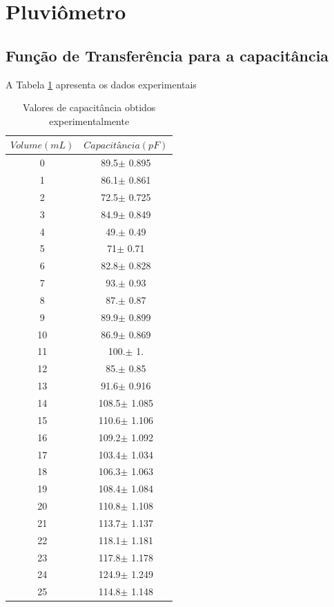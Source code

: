 \documentclass[a4paper]{instrumentacao}
\begin{document}

\section{Pluviômetro}
\subsection{Função de Transferência para a capacitância}

A Tabela \ref{tab:resultados-pluviometro-capacitancia} apresenta os dados experimentais 

\begin{longtable}{cc}
\caption{Valores de capacitância obtidos experimentalmente} \label{tab:resultados-pluviometro-capacitancia} \\
\textbf{$Volume (mL)$} & \textbf{$Capacitância (pF)$} \\ \hline
 0 & 89.5$\pm$ 0.895 \\
 1 & 86.1$\pm$ 0.861 \\
 2 & 72.5$\pm$ 0.725 \\
 3 & 84.9$\pm$ 0.849 \\
 4 & 49.$\pm$ 0.49 \\
 5 & 71$\pm$ 0.71 \\
 6 & 82.8$\pm$ 0.828 \\
 7 & 93.$\pm$ 0.93 \\
 8 & 87.$\pm$ 0.87 \\
 9 & 89.9$\pm$ 0.899 \\
 10 & 86.9$\pm$ 0.869 \\
 11 & 100.$\pm$ 1. \\
 12 & 85.$\pm$ 0.85 \\
 13 & 91.6$\pm$ 0.916 \\
 14 & 108.5$\pm$ 1.085 \\
 15 & 110.6$\pm$ 1.106 \\
 16 & 109.2$\pm$ 1.092 \\
 17 & 103.4$\pm$ 1.034 \\
 18 & 106.3$\pm$ 1.063 \\
 19 & 108.4$\pm$ 1.084 \\
 20 & 110.8$\pm$ 1.108 \\
 21 & 113.7$\pm$ 1.137 \\
 22 & 118.1$\pm$ 1.181 \\
 23 & 117.8$\pm$ 1.178 \\
 24 & 124.9$\pm$ 1.249 \\
 25 & 114.8$\pm$ 1.148 \\

\end{longtable}
\end{document}
